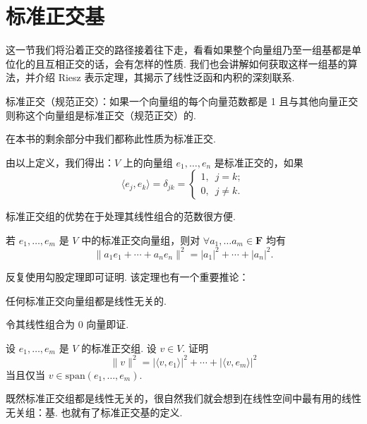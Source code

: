 \section{标准正交基}

这一节我们将沿着正交的路径接着往下走，看看如果整个向量组乃至一组基都是单位化的且互相正交的话，会有怎样的性质. 
我们也会讲解如何获取这样一组基的算法，并介绍 Riesz 表示定理，其揭示了线性泛函和内积的深刻联系. 

\begin{definition}
    标准正交（规范正交）：如果一个向量组的每个向量范数都是 1 且与其他向量正交
    则称这个向量组是标准正交（规范正交）的. 
\end{definition}

在本书的剩余部分中我们都称此性质为标准正交. 

由以上定义，我们得出：$ V $ 上的向量组 $ e_1, \ldots , e_n $ 是标准正交的，如果
\[ \langle e_j, e_k \rangle = \delta _{jk} = 
\begin{cases}
    1, \enspace j = k; \\
    0, \enspace j \neq k.
\end{cases}\]

标准正交组的优势在于处理其线性组合的范数很方便. 

\begin{theorem}
    若 $e_1, \ldots , e_m$ 是 $ V $ 中的标准正交向量组，则对 $\forall a_1, \ldots a_m \in \mathbf{F}$ 均有
    \[ \lVert a_1e_1 + \cdots + a_ne_n\rVert^2 = \lvert a_1 \rvert^2 + \cdots + \lvert a_n \rvert^2.\]
\end{theorem}

反复使用勾股定理即可证明. 该定理也有一个重要推论：

\begin{theorem}
    任何标准正交向量组都是线性无关的.
\end{theorem}

令其线性组合为 0 向量即证. 

\begin{example}
    设 $e_1, \ldots , e_m$ 是 $ V $ 的标准正交组. 设 $ v \in V $. 证明
    \[ \lVert v \rVert^2 = \lvert \langle v, e_1\rangle \rvert^2 + \cdots + \lvert \langle v, e_m\rangle \rvert^2 \]
    当且仅当 $ v \in \mathrm{span}(e_1, \ldots , e_m).$
\end{example}

\vspace{2ex}

既然标准正交组都是线性无关的，很自然我们就会想到在线性空间中最有用的线性无关组：基. 
也就有了标准正交基的定义. 


